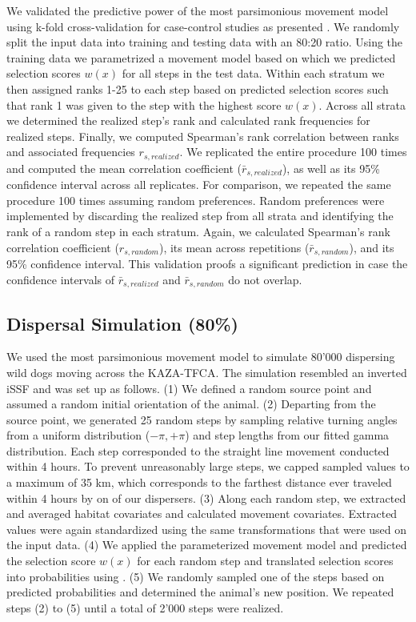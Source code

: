 \documentclass[abstract=on,10pt,a4paper,bibliography=totocnumbered]{article}
\begin{document}
We validated the predictive power of the most parsimonious movement model using
k-fold cross-validation for case-control studies as presented
\cite{Fortin.2009}. We randomly split the input data into training and testing
data with an 80:20 ratio. Using the training data we parametrized a movement
model based on which we predicted selection scores \(w(x)\) for all steps in the
test data. Within each stratum we then assigned ranks 1-25 to each step based on
predicted selection scores such that rank 1 was given to the step with the
highest score \(w(x)\). Across all strata we determined the realized step's rank
and calculated rank frequencies for realized steps. Finally, we computed
Spearman's rank correlation between ranks and associated frequencies \(r_{s,
realized}\). We replicated the entire procedure 100 times and computed the mean
correlation coefficient (\(\bar{r}_{s, realized}\)), as well as its 95\%
confidence interval across all replicates. For comparison, we repeated the same
procedure 100 times assuming random preferences. Random preferences were
implemented by discarding the realized step from all strata and identifying the
rank of a random step in each stratum. Again, we calculated Spearman's rank
correlation coefficient (\(r_{s, random}\)), its mean across repetitions
(\(\bar{r}_{s, random}\)), and its 95\% confidence interval. This validation
proofs a significant prediction in case the confidence intervals of
\(\bar{r}_{s, realized}\) and \(\bar{r}_{s, random}\) do not overlap.

\subsection{Dispersal Simulation (80\%)}
We used the most parsimonious movement model to simulate 80'000 dispersing wild
dogs moving across the KAZA-TFCA. The simulation resembled an inverted iSSF and
was set up as follows. (1) We defined a random source point and assumed a random
initial orientation of the animal. (2) Departing from the source point, we
generated 25 random steps by sampling relative turning angles from a uniform
distribution (\(-\pi, +\pi\)) and step lengths from our fitted gamma
distribution. Each step corresponded to the straight line movement conducted
within 4 hours. To prevent unreasonably large steps, we capped sampled values to
a maximum of 35 km, which corresponds to the farthest distance ever traveled
within 4 hours by on of our dispersers. (3) Along each random step, we extracted
and averaged habitat covariates and calculated movement covariates. Extracted
values were again standardized using the same transformations that were used on
the input data. (4) We applied the parameterized movement model and predicted
the selection score \(w(x)\) for each random step and translated selection
scores into probabilities using . (5) We randomly sampled one of the
steps based on predicted probabilities and determined the animal's new position.
We repeated steps (2) to (5) until a total of 2'000 steps were realized.
\end{document}
